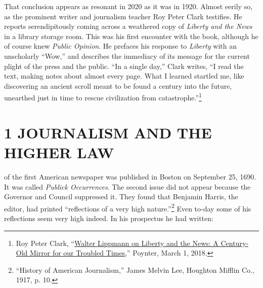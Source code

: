 \documentclass[openany,nobib,nohyper]{tufte-book}
\let\oldchapter\chapter
\def\chapter{%
  \setcounter{footnote}{0}%
  \oldchapter
}
\begin{document}
That conclusion appears as resonant in 2020 as it was in 1920. Almost
eerily so, as the prominent writer and journalism teacher Roy Peter Clark
testifies. He reports serendipitously coming across a weathered copy of
\emph{Liberty and the News} in a library storage room. This was his
first encounter with the book, although he of course knew \emph{Public
Opinion}. He prefaces his response to \emph{Liberty} with an unscholarly
``Wow,'' and describes the immediacy of its message for the current
plight of the press and the public. ``In a single day,'' Clark writes,
``I read the text, making notes about almost every page. What I learned
startled me, like discovering an ancient scroll meant to be found a
century into the future, unearthed just in time to rescue civilization
from catastrophe.''\footnote{Roy Peter Clark, ``\href{https://www.poynter.org/ethics-trust/2018/walter-lippmann-on-liberty-and-the-news-a-century-old-mirror-for-our-troubled-times/}{Walter Lippmann on Liberty and the News: A
  Century-Old Mirror for our Troubled Times},'' Poynter, March 1, 2018.}


\newpage
\begin{fullwidth}


\thispagestyle{empty}

\begingroup
\setlength{\parindent}{10pt}


\endgroup

\end{fullwidth}

\mainmatter{}\setcounter{page}{1}


\chapter[1 \hspace*{1mm} JOURNALISM AND THE HIGHER LAW]{1 JOURNALISM AND THE HIGHER LAW}
\label{ch:JOURNALISM}

 of the first American newspaper was published in
Boston on September 25, 1690. It was called \emph{Publick Occurrences}.
The second issue did not appear because the Governor and Council
suppressed it. They found that Benjamin Harris, the editor, had printed
``reflections of a very high
nature.''\footnote{``History of American Journalism,'' James Melvin Lee, Houghton Mifflin
  Co., 1917, p. 10.} Even to-day some of his
reflections seem very high indeed. In his prospectus he had written:
\end{document}
